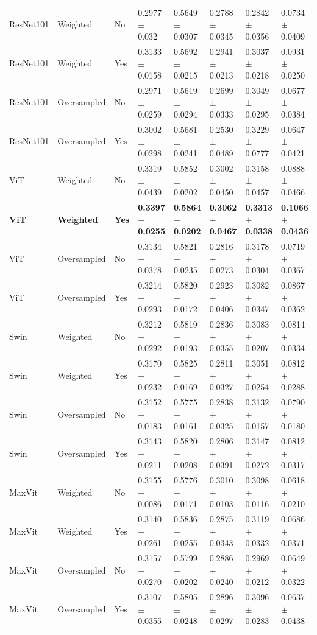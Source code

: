\documentclass[a4paper,10pt]{book}
\begin{document}
\begin{scriptsize}
\begin{longtable}{@{}l l p{0.6cm} p{1.5cm} p{1.5cm} p{1.5cm} p{1.5cm} p{1.5cm}@{}}
\bottomrule
\endlastfoot
ResNet101 & Weighted    & No  & 0.2977 $\pm$ 0.032  & 0.5649 $\pm$ 0.0307 & 0.2788 $\pm$ 0.0345 & 0.2842 $\pm$ 0.0356 & 0.0734 $\pm$ 0.0409 \\
ResNet101 & Weighted    & Yes & 0.3133 $\pm$ 0.0158 & 0.5692 $\pm$ 0.0215 & 0.2941 $\pm$ 0.0213 & 0.3037 $\pm$ 0.0218 & 0.0931 $\pm$ 0.0250 \\
ResNet101 & Oversampled & No  & 0.2971 $\pm$ 0.0259 & 0.5619 $\pm$ 0.0294 & 0.2699 $\pm$ 0.0333 & 0.3049 $\pm$ 0.0295 & 0.0677 $\pm$ 0.0384 \\
ResNet101 & Oversampled & Yes & 0.3002 $\pm$ 0.0298 & 0.5681 $\pm$ 0.0241 & 0.2530 $\pm$ 0.0489 & 0.3229 $\pm$ 0.0777 & 0.0647 $\pm$ 0.0421 \\
ViT       & Weighted    & No  & 0.3319 $\pm$ 0.0439 & 0.5852 $\pm$ 0.0202 & 0.3002 $\pm$ 0.0450 & 0.3158 $\pm$ 0.0457 & 0.0888 $\pm$ 0.0466 \\
\textbf{ViT} & \textbf{Weighted} & \textbf{Yes} &
\textbf{0.3397 $\pm$ 0.0255} & \textbf{0.5864 $\pm$ 0.0202} &
\textbf{0.3062 $\pm$ 0.0467} & \textbf{0.3313 $\pm$ 0.0338} &
\textbf{0.1066 $\pm$ 0.0436} \\
ViT       & Oversampled & No  & 0.3134 $\pm$ 0.0378 & 0.5821 $\pm$ 0.0235 & 0.2816 $\pm$ 0.0273 & 0.3178 $\pm$ 0.0304 & 0.0719 $\pm$ 0.0367 \\
ViT       & Oversampled & Yes & 0.3214 $\pm$ 0.0293 & 0.5820 $\pm$ 0.0172 & 0.2923 $\pm$ 0.0406 & 0.3082 $\pm$ 0.0347 & 0.0867 $\pm$ 0.0362 \\
Swin      & Weighted    & No  & 0.3212 $\pm$ 0.0292 & 0.5819 $\pm$ 0.0193 & 0.2836 $\pm$ 0.0355 & 0.3083 $\pm$ 0.0207 & 0.0814 $\pm$ 0.0334 \\
Swin      & Weighted    & Yes & 0.3170 $\pm$ 0.0232 & 0.5825 $\pm$ 0.0169 & 0.2811 $\pm$ 0.0327 & 0.3051 $\pm$ 0.0254 & 0.0812 $\pm$ 0.0288 \\
Swin      & Oversampled & No  & 0.3152 $\pm$ 0.0183 & 0.5775 $\pm$ 0.0161 & 0.2838 $\pm$ 0.0325 & 0.3132 $\pm$ 0.0157 & 0.0790 $\pm$ 0.0180 \\
Swin      & Oversampled & Yes & 0.3143 $\pm$ 0.0211 & 0.5820 $\pm$ 0.0208 & 0.2806 $\pm$ 0.0391 & 0.3147 $\pm$ 0.0272 & 0.0812 $\pm$ 0.0317 \\
MaxVit    & Weighted    & No  & 0.3155 $\pm$ 0.0086 & 0.5776 $\pm$ 0.0171 & 0.3010 $\pm$ 0.0103 & 0.3098 $\pm$ 0.0116 & 0.0618 $\pm$ 0.0210 \\
MaxVit    & Weighted    & Yes & 0.3140 $\pm$ 0.0261 & 0.5836 $\pm$ 0.0255 & 0.2875 $\pm$ 0.0343 & 0.3119 $\pm$ 0.0332 & 0.0686 $\pm$ 0.0371 \\
MaxVit    & Oversampled & No  & 0.3157 $\pm$ 0.0270 & 0.5799 $\pm$ 0.0202 & 0.2886 $\pm$ 0.0240 & 0.2969 $\pm$ 0.0212 & 0.0649 $\pm$ 0.0322 \\
MaxVit    & Oversampled & Yes & 0.3107 $\pm$ 0.0355 & 0.5805 $\pm$ 0.0248 & 0.2896 $\pm$ 0.0297 & 0.3096 $\pm$ 0.0283 & 0.0637 $\pm$ 0.0438 \\
\end{longtable}
\end{scriptsize}
\end{document}
